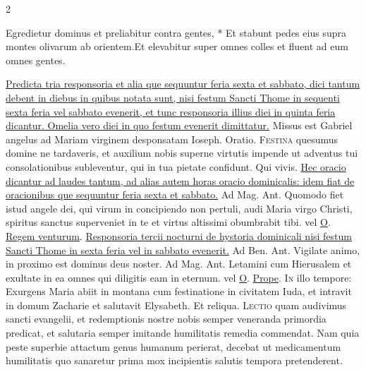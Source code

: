 \begin{multicols*}{2}
\begin{responsory-doxology}
{Egredietur dominus et preliabitur contra gentes, * Et stabunt pedes eius supra montes olivarum ab orientem.}{Et elevabitur super omnes colles et fluent ad eum omnes gentes.}
\end{responsory-doxology}%
\newline \ul{Predicta tria responsoria et alia que sequuntur feria sexta et sabbato, dici tantum debent in diebus in quibus notata sunt, nisi festum Sancti Thome in sequenti sexta feria vel sabbato evenerit, et tunc responsoria illius diei in quinta feria dicantur. Omelia vero diei in quo festum evenerit dimittatur.}
 Missus est Gabriel angelus ad Mariam virginem desponsatam Ioseph. {\color{Red} Oratio.}
\lettrine[lines=2]{\zallmancaps \color{Blue} F}{estina} quesumus domine ne tardaveris, et auxilium nobis superne virtutis impende ut adventus tui consolationibus subleventur, qui in tua pietate confidunt. Qui vivis.
\newline \ul{Hec oracio dicantur ad laudes tantum, ad alias autem horas oracio dominicalis: idem fiat de oracionibus que sequuntur feria sexta et sabbato.} {\color{Red} Ad Mag. Ant.} Quomodo fiet istud angele dei, qui virum in concipiendo non pertuli, audi Maria virgo Christi, spiritus sanctus superveniet in te et virtus altissimi obumbrabit tibi. {\color{Red} vel} \hyperlink{o-antiphons}{O}.
 \hyperlink{regem-venturum}{Regem venturum}.
\newline \ul{Responsoria tercii nocturni de hystoria dominicali nisi festum Sancti Thome in sexta feria vel in sabbato evenerit.} {\color{Red} Ad Ben. Ant.} Vigilate animo, in proximo est dominus deus noster. {\color{Red} Ad Mag. Ant.} Letamini cum Hierusalem et exultate in ea omnes qui diligitis eam in eternum. {\color{Red} vel} \hyperlink{o-antiphons}{O}.
 \hyperlink{prope-est-iam-invitatorium}{Prope}.
\lettrine[lines=2]{\zallmancaps \color{Blue} I}{n} illo tempore: Exurgens Maria abiit in montana cum festinatione in civitatem Iuda, et intravit in domum Zacharie et salutavit Elysabeth. Et reliqua.
\lettrine[lines=2]{\zallmancaps \color{Red} L}{ectio} quam audivimus sancti evangelii, et redemptionis nostre nobis semper veneranda primordia predicat, et salutaria semper imitande humilitatis remedia commendat. Nam quia peste superbie attactum genus humanum perierat, decebat ut medicamentum humilitatis quo sanaretur prima mox incipientis salutis tempora pretenderent.

\end{multicols*}
